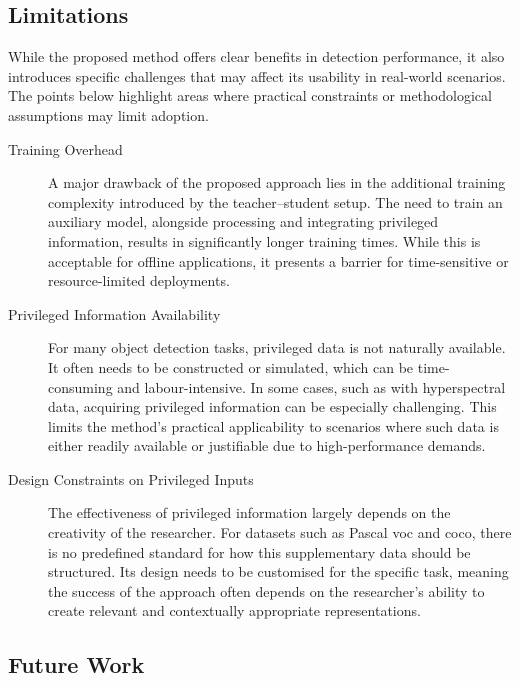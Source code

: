 \subsection*{Limitations}

While the proposed method offers clear benefits in detection performance, it also introduces specific challenges that may affect its usability in real-world scenarios. The points below highlight areas where practical constraints or methodological assumptions may limit adoption.

\begin{description}

\item[Training Overhead]
A major drawback of the proposed approach lies in the additional training complexity introduced by the teacher–student setup. The need to train an auxiliary model, alongside processing and integrating privileged information, results in significantly longer training times. While this is acceptable for offline applications, it presents a barrier for time-sensitive or resource-limited deployments.

\item[Privileged Information Availability]
For many object detection tasks, privileged data is not naturally available. It often needs to be constructed or simulated, which can be time-consuming and labour-intensive. In some cases, such as with hyperspectral data, acquiring privileged information can be especially challenging. This limits the method’s practical applicability to scenarios where such data is either readily available or justifiable due to high-performance demands.

\item[Design Constraints on Privileged Inputs]
The effectiveness of privileged information largely depends on the creativity of the researcher. For datasets such as Pascal \gls{voc} and \gls{coco}, there is no predefined standard for how this supplementary data should be structured. Its design needs to be customised for the specific task, meaning the success of the approach often depends on the researcher’s ability to create relevant and contextually appropriate representations.

\end{description}

\subsection*{Future Work}

